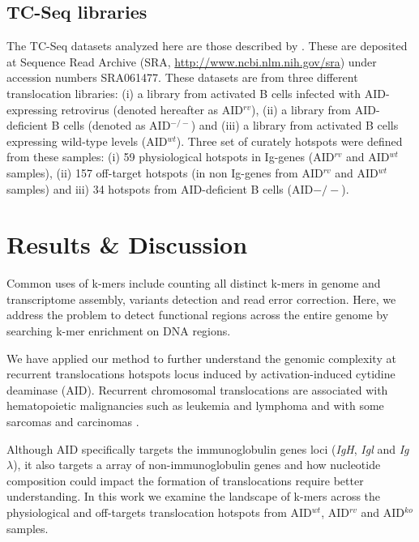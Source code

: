 \documentclass{bioinfo}
\begin{document}
\subsection{TC-Seq libraries}\label{methods:tcseqhs}
The TC-Seq datasets analyzed here are those described by \cite{pmid21962510}. These are deposited at Sequence Read Archive (SRA, \url{http://www.ncbi.nlm.nih.gov/sra}) under accession numbers SRA061477. These datasets are from three different translocation libraries: (i) a library from activated B cells infected with AID-expressing retrovirus (denoted hereafter as AID$^{rv}$), (ii) a library from AID-deficient B cells (denoted as AID$^{-/-}$) and (iii)  a library from activated B cells expressing wild-type levels (AID$^{wt}$). Three set of curately hotspots were defined from these samples: (i) 59 physiological hotspots in Ig-genes (AID$^{rv}$ and AID$^{wt}$ samples), (ii) 157 off-target hotspots (in non Ig-genes from AID$^{rv}$ and  AID$^{wt}$ samples) and iii) 34 hotspots from AID-deficient B cells (AID$-/-$). 


\section{Results \& Discussion}

Common uses of k-mers include counting all distinct k-mers in genome and transcriptome assembly, variants detection and read error correction\cite{pmid23325618}. Here, we address the problem to detect functional regions across the entire genome by searching k-mer enrichment on DNA regions.

We have applied our method to further understand the genomic complexity at recurrent translocations hotspots locus induced by activation-induced cytidine deaminase (AID). Recurrent chromosomal translocations are associated with hematopoietic malignancies such as leukemia and lymphoma and with some sarcomas and carcinomas \cite{pmid20371343}.

Although AID specifically targets the immunoglobulin genes loci (\emph{IgH}, \emph{Igl} and \emph{Ig}$\lambda$), it also targets a array of non-immunoglobulin genes and how nucleotide composition could impact the formation of translocations require better understanding. In this work we examine the landscape of k-mers across the physiological and off-targets translocation hotspots from AID$^{wt}$, AID$^{rv}$ and AID$^{ko}$ samples.
\end{document}
